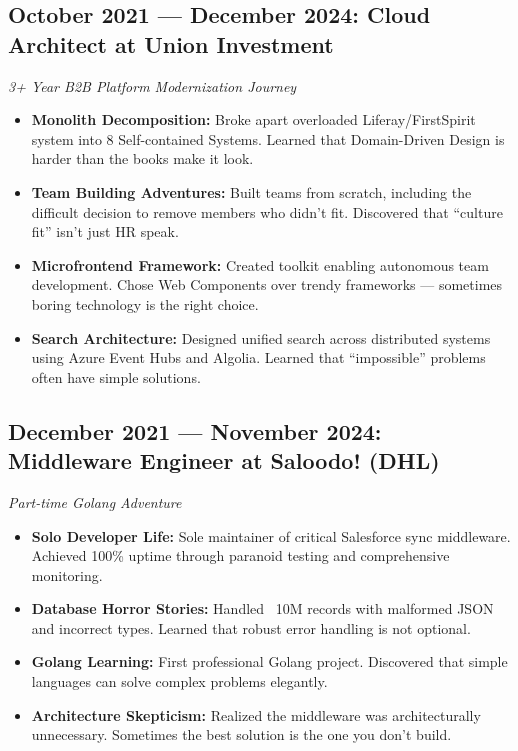 \documentclass[11pt,a4paper]{article}
\begin{document}
\subsection*{October 2021 --- December 2024: Cloud Architect at Union Investment}
\textit{3+ Year B2B Platform Modernization Journey}

\begin{itemize}[nosep,leftmargin=1.5em]
    \item \textbf{Monolith Decomposition:} Broke apart overloaded Liferay/FirstSpirit system into 8 Self-contained Systems. Learned that Domain-Driven Design is harder than the books make it look.
    \item \textbf{Team Building Adventures:} Built teams from scratch, including the difficult decision to remove members who didn't fit. Discovered that ``culture fit'' isn't just HR speak.
    \item \textbf{Microfrontend Framework:} Created toolkit enabling autonomous team development. Chose Web Components over trendy frameworks --- sometimes boring technology is the right choice.
    \item \textbf{Search Architecture:} Designed unified search across distributed systems using Azure Event Hubs and Algolia. Learned that ``impossible'' problems often have simple solutions.
\end{itemize}

\subsection*{December 2021 --- November 2024: Middleware Engineer at Saloodo! (DHL)}
\textit{Part-time Golang Adventure}

\begin{itemize}[nosep,leftmargin=1.5em]
    \item \textbf{Solo Developer Life:} Sole maintainer of critical Salesforce sync middleware. Achieved 100\% uptime through paranoid testing and comprehensive monitoring.
    \item \textbf{Database Horror Stories:} Handled ~10M records with malformed JSON and incorrect types. Learned that robust error handling is not optional.
    \item \textbf{Golang Learning:} First professional Golang project. Discovered that simple languages can solve complex problems elegantly.
    \item \textbf{Architecture Skepticism:} Realized the middleware was architecturally unnecessary. Sometimes the best solution is the one you don't build.
\end{itemize}
\end{document}
